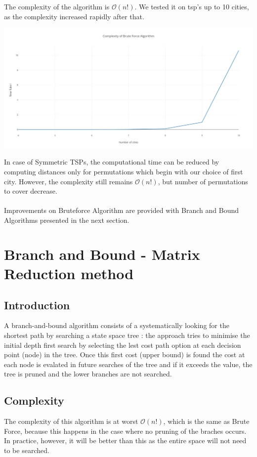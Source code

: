 \documentclass[11pt, english]{article}
\begin{document}
\noindent
The complexity of the algorithm is $\mathcal{O}(n!)$. We tested it on tsp's up to 10 cities, as the complexity increased rapidly after that.

\begin{center}
\includegraphics[scale=0.3]{bruteforce.png}
\end{center}

\noindent
In case of Symmetric TSPs, the computational time can be reduced by computing distances only for permutations which begin with our choice of first city. However, the complexity still remains $\mathcal{O}(n!)$, but number of permutations to cover decrease.\\
\\
\noindent
Improvements on Bruteforce Algorithm are provided with Branch and Bound Algorithms presented in the next section.


\newpage
\section{Branch and Bound - Matrix Reduction method}
\subsection{Introduction}
A branch-and-bound algorithm consists of a systematically looking for the shortest path by searching a state space tree : the approach tries to minimise the initial depth first search by selecting the lest cost path option at each decision point (node) in the tree. Once this first cost (upper bound) is found the cost at each node is evalated in future searches of the tree and if it exceeds the value, the tree is pruned and the lower branches are not searched.

\subsection{Complexity}
\noindent
The complexity of this algorithm is at worst $\mathcal{O}(n!)$, which is the same as Brute Force, because this happens in the case where no pruning of the braches occurs. In practice, however, it will be better than this as the entire space will not need to be searched.
\end{document}
